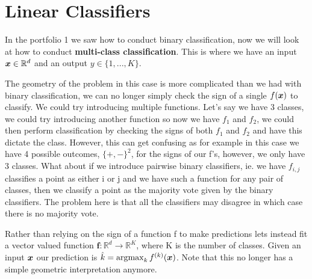 \section{Linear Classifiers}
In the portfolio 1 we saw how to conduct binary classification, now we will look at how to conduct \textbf{multi-class classification}. This is where we have an input $\bm{x} \in \mathbb{R}^{d}$ and an output $y \in \{1,...,K\}$.

The geometry of the problem in this case is more complicated than we had with binary classification, we can no longer simply check the sign of a single $f(\bm{x})$ to classify. We could try introducing multiple functions. Let's say we have 3 classes, we could try introducing another function so now we have $f_{1}$ and $f_{2}$, we could then perform classification by checking the signs of both $f_{1}$ and $f_{2}$ and have this dictate the class. However, this can get confusing as for example in this case we have 4 possible outcomes, $\{+,-\}^{2}$, for the signs of our f's, however, we only have 3 classes. What about if we introduce pairwise binary classifiers, ie. we have $f_{i,j}$ classifies a point as either i or j and we have such a function for any pair of classes, then we classify a point as the majority vote given by the binary classifiers. The problem here is that all the classifiers may disagree in which case there is no majority vote.

Rather than relying on the sign of a function f to make predictions lets instead fit a vector valued function $\bm{f}: \mathbb{R}^{d} \rightarrow \mathbb{R}^{K}$, where K is the number of classes. Given an input $\bm{x}$ our prediction is $\hat{k} = \operatorname*{arg\!\max}_{k} f^{(k)} (\bm{x})$. Note that this no longer has a simple geometric interpretation anymore. 

